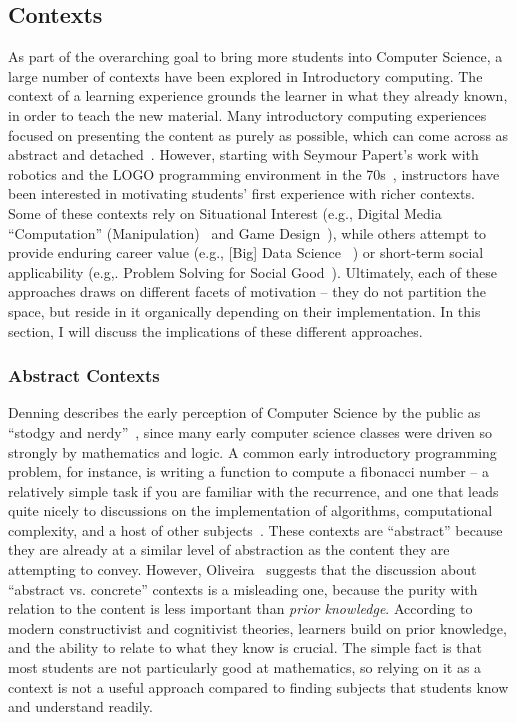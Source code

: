 \subsection{Contexts}

As part of the overarching goal to bring more students into Computer Science, a large number of contexts have been explored in Introductory computing. 
The context of a learning experience grounds the learner in what they already known, in order to teach the new material.
Many introductory computing experiences focused on presenting the content as purely as possible, which can come across as abstract and detached~\cite{Zografski}.
However, starting with Seymour Papert's work with robotics and the LOGO programming environment in the 70s~\cite{papert1996}, instructors have been interested in motivating students' first experience with richer contexts.
Some of these contexts rely on Situational Interest (e.g.,  Digital Media ``Computation'' (Manipulation)~\cite{Forte} and Game Design~\cite{Zografski}), while others attempt to provide enduring career value (e.g., [Big] Data Science ~\cite{Anderson}) or short-term social applicability (e.g,. Problem Solving for Social Good~\cite{SocialGoodinComputingEducation}).
Ultimately, each of these approaches draws on different facets of motivation -- they do not partition the space, but reside in it organically depending on their implementation.
In this section, I will discuss the implications of these different approaches.


\subsubsection{Abstract Contexts}

Denning describes the early perception of Computer Science by the public as ``stodgy and nerdy''~\cite{Denning:2005}, since many early computer science classes were driven so strongly by mathematics and logic.
A common early introductory programming problem, for instance, is writing a function to compute a fibonacci number -- a relatively simple task if you are familiar with the recurrence, and one that leads quite nicely to discussions on the implementation of algorithms, computational complexity, and a host of other subjects~\cite{crazypantsfibonaccipaper}.
These contexts are ``abstract'' because they are already at a similar level of abstraction as the content they are attempting to convey.
However, Oliveira~\cite{ConcreteVsAbstract} suggests that the discussion about ``abstract vs. concrete'' contexts is a misleading one, because the purity with relation to the content is less important than \textit{prior knowledge}.
According to modern constructivist and cognitivist theories, learners build on prior knowledge, and the ability to relate to what they know is crucial.
The simple fact is that most students are not particularly good at mathematics, so relying on it as a context is not a useful approach compared to finding subjects that students know and understand readily.

